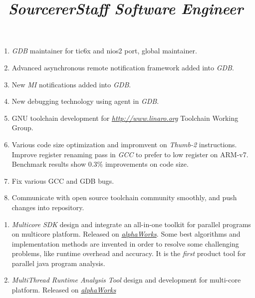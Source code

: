 \begin{resume}
\title{\emph{Sourcerer}}
\begin{position}
\begin{enumerate}
\item[] \emph{GDB} maintainer for tic6x and nios2 port, global maintainer.
\item[] Advanced asynchronous remote notification framework added into \emph{GDB}.
\item[] New \emph{MI} notifications added into \emph{GDB}.
\item[] New debugging technology using agent in \emph{GDB}.
\item[] GNU toolchain development for \href{http://www.linaro.org}{\emph{http://www.linaro.org}} Toolchain Working Group.
\item[] Various code size optimization and impromvent on \emph{Thumb-2} instructions.  Improve register renaming pass in \emph{GCC} to prefer to low register on ARM-v7.  Benchmark results show 0.3\% improvements on code size.
\item[] Fix various GCC and GDB bugs.
\item[] Communicate with open source toolchain community smoothly, and push changes into repository.
\end{enumerate}
\end{position}

\title{\emph{Staff Software Engineer}}
\begin{position}
\begin{enumerate}
\item[] \emph{Multicore SDK} design and integrate an all-in-one toolkit for parallel programs on multicore platform.  Released on \href{http://www.alphaworks.ibm.com/tech/msdk}{\emph{alphaWorks}}.  Some best algorithms and implementation methods are invented in order to resolve some challenging problems, like runtime overhead and accuracy.  It is the \emph{first} product tool for parallel java program analysis.
\item[] \emph{MultiThread Runtime Analysis Tool} design and development for multi-core platform.  Released on \href{http://www.alphaworks.ibm.com/tech/mtrat}{\emph{alphaWorks}}


\end{enumerate}
\end{position}
\end{resume}
